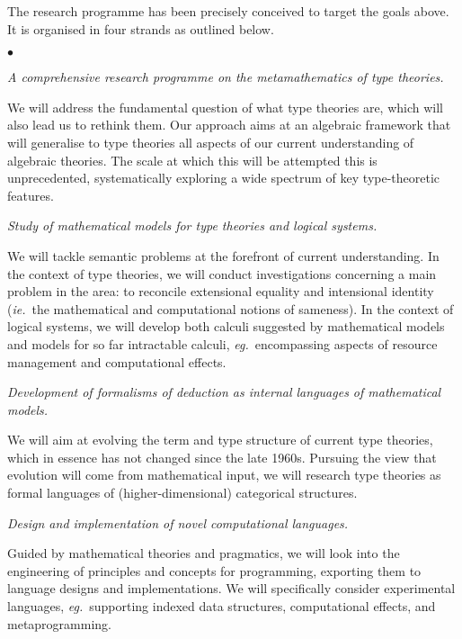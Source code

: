 \documentclass[11pt,twocolumn]{article}
\newenvironment{myitemize}
  {\begin{list}{$\bullet$}
  {\setlength{\topsep}{1pt}
   \setlength{\partopsep}{1pt}
   \setlength{\itemsep}{0pt}
   \setlength{\parsep}{0pt}
   \setlength{\leftmargin}{1em}
   \setlength{\labelwidth}{.5em}}}
  {\end{list}}
\newcommand{\eg}{\emph{eg.}}
\newcommand{\ie}{\emph{ie.}}
\begin{document}
The research programme has been precisely conceived to target the goals
above.  It is organised in four strands as outlined below.
\begin{myitemize}
\item[{\bfseries 1\enspace Foundations:}]\mbox{}\enspace\thinspace 
  \emph{A comprehensive research programme on the metamathematics of type
    theories.}

  \vspace*{1mm}
  We will address the fundamental question of what type theories are, which
  will also lead us to rethink them.  Our approach aims at an algebraic
  framework that will generalise to type theories all aspects of our current
  understanding of algebraic theories.  The scale at which this will be
  attempted this is unprecedented, systematically exploring a wide spectrum of
  key type-theoretic features.
  \vspace*{1mm}

\item[{\bfseries 2\enspace Models:}]\mbox{}\enspace\thinspace
  \emph{Study of mathematical models for type theories and logical systems.}

  \vspace*{1mm}
  We will tackle semantic problems at the forefront of current understanding.
  In the context of type theories, we will conduct investigations
  concerning a main problem in the area: to reconcile extensional equality
  and intensional identity (\ie~the mathematical and computational notions
  of sameness).  
  In the context of logical systems, we will develop both calculi suggested by
  mathematical models and models for so far intractable calculi,
  \eg~encompassing aspects of resource management and computational effects.  
  \vspace*{1mm}%
  
\item[{\bfseries 3\enspace Calculi:}]\mbox{}\enspace\thinspace
  \emph{Development of formalisms of deduction as internal languages of
    mathematical models.}
  
  \vspace*{1mm}
  We will aim at evolving the term and type structure of current type
  theories, which in essence has not changed since the late 1960s.  Pursuing
  the view that evolution will come from mathematical input, we will
  research type theories as formal languages of (higher-dimensional)
  categorical structures.  
  \vspace*{1mm}

\item[{\bfseries 4\enspace Programming:}]\mbox{}\enspace\thinspace
  \emph{Design and implementation of novel computational languages.}

  \vspace*{1mm}
  Guided by mathematical theories and pragmatics, we will look into the
  engineering of principles and concepts for programming, exporting them to
  language designs and implementations.  We will specifically consider
  experimental languages, \eg~supporting indexed data structures,
  computational effects, and metaprogramming.  
\end{myitemize}
\end{document}
